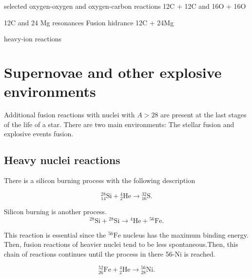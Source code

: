 \documentclass[openany]{book}
\begin{document}
selected oxygen-oxygen and oxygen-carbon reactions \cite{kovar_geesaman_braid_eisen_henning_ophel_paul_rehm_sanders_sperr_et_1979}
\cite{wang_ren_bai_2020}
12C + 12C and 16O + 16O \cite{assuncao_descouvemont_2015}

12C and 24 Mg resonances \cite{descouvemont_2021}
Fusion hidrance 12C + 24Mg \cite{montagnoli_stefanini_jiang_colucci_goasduff_brugnara_mazzocco_siciliano_scarlassara_corradi_et_2020}

heavy-ion  reactions \cite{nobre_chamon_gasques_carlson_thompson_2007}


\section{Supernovae and other explosive environments} \label{sec:explosive}

Additional fusion reactions with nuclei with $A > 28$ are present at the last stages of the life of a star. There are two main environments: The stellar fusion and explosive events fusion.


\subsection{Heavy nuclei reactions} \label{sub:heavyReactions}

There is a silicon burning process with the following description 

\begin{equation} \label{eq:reaction_28Sialpha}
	\mathrm{{}^{28}_{14}Si +{}^{4}_{2}He \rightarrow {}^{32}_{16}S}.
\end{equation}

Silicon burning is another process.\\

\begin{equation} \label{eq:reaction_28Sifusion_alpha56Fe}
	\mathrm{{}^{28}Si + {}^{28}Si \rightarrow {}^{4}He + {}^{56}Fe }.
\end{equation}

This reaction is essential since the $\mathrm{{}^{56}Fe}$ nucleus has the maximum binding energy. Then, fusion reactions of heavier nuclei tend to be less spontaneous.Then,  this chain of reactions continues until the process in there 56-Ni is reached.

\begin{equation}  \label{eq:reaction_52Fealpha}
	\mathrm{{}^{52}_{26}Fe +{}^{4}_{2}He \rightarrow {}^{56}_{28}Ni}.
\end{equation}
\end{document}
